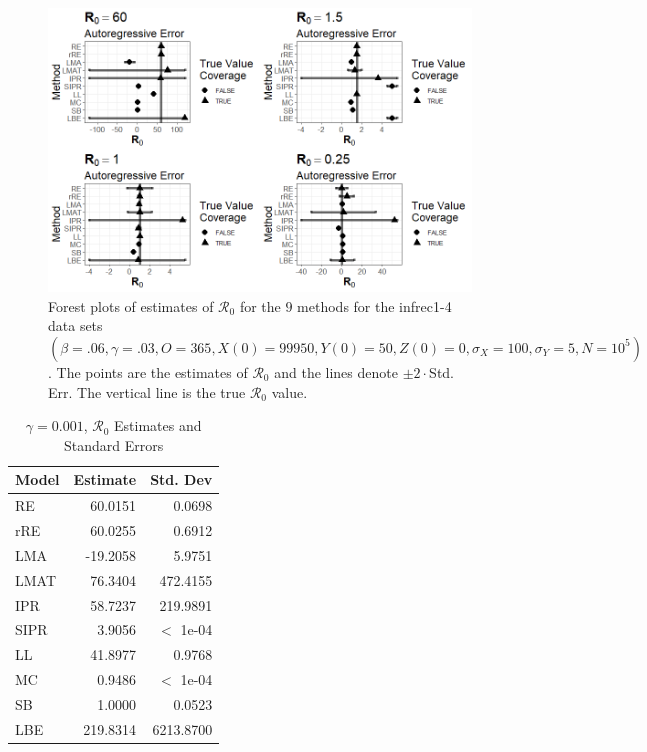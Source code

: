 \documentclass[12pt]{article}
\newcommand{\xxsir}{\ensuremath{9} } %
\newcommand{\rr}{\ensuremath{\mathcal{R}_0}}
\begin{document}
\begin{figure}[H]
	\centering
	\includegraphics[scale=0.5]{images/parchange_ar.tiff}
	\caption{Forest plots of estimates of $\rr$ for the \xxsir methods for the infrec1-4 data sets $(\beta=.06, \gamma=.03, O=365, X(0)=99950, Y(0)=50, Z(0)=0, \sigma_X=100, \sigma_Y=5, N=10^5)$.  The points are the estimates of $\rr$ and the lines denote $\pm 2\cdot $Std. Err.  The vertical line is the true $\rr$ value.}
\end{figure}
\begin{table}[H]
	
	\centering
	\begin{tabular}[t]{l|r|r}
		\hline
		Model & Estimate & Std. Dev\\
		\hline
		RE & 60.0151 & 0.0698\\
		\hline
		rRE & 60.0255 & 0.6912\\
		\hline
		LMA & -19.2058 & 5.9751\\
		\hline
		LMAT & 76.3404 & 472.4155\\
		\hline
		IPR & 58.7237 & 219.9891\\
		\hline
		SIPR & 3.9056 & $<$ 1e-04\\
		\hline
		LL & 41.8977 & 0.9768\\
		\hline
		MC & 0.9486 & $<$ 1e-04\\
		\hline
		SB & 1.0000 & 0.0523\\
		\hline
		LBE & 219.8314 & 6213.8700 \\
		\hline
	\end{tabular}
	\caption{$\gamma = 0.001$, $\rr$ Estimates and Standard Errors}
\end{table}
\end{document}
